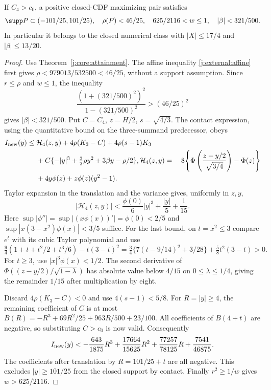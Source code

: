 \begin{proposition}\label{j:finite:n4-localization}
If $C_4>c_0$, a positive closed-CDF maximizing pair satisfies
\[
 \supp P\subset(-101/25,101/25),\quad\rho(P)<46/25,
 \quad 625/2116<w\le1,\quad|\beta|<321/500.
\]
In particular it belongs to the closed numerical class with
$|X|\le17/4$ and $|\beta|\le13/20$.
\end{proposition}
\begin{proof}
Use Theorem~\ref{j:core:attainment}.  The affine inequality
\eqref{j:external:affine} first gives
$\rho<979013/532500<46/25$, without a support assumption.
Since $r\le\rho$ and $w\le1$, the inequality
\[
 \frac{(1+(321/500)^2)^2}{1-(321/500)^2}>(46/25)^2
\]
gives $|\beta|<321/500$.
Put $C=C_4$, $z=H/2$, $s=\sqrt{4/3}$.  The contact expression,
using the quantitative bound on the three-summand predecessor, obeys
\begin{align*}
 I_{\rm new}(y)\le{}&\mathcal H_4(z,y)+4\rho(K_3-C)
                    +4\rho(s-1)K_3\\
 &+C\{-|y|^3+\tfrac32\rho y^2+3\beta y-\rho/2\},
\mathcal H_4(z,y)={}&8\!\left\{\Phi\left(\frac{z-y/2}{\sqrt{3/4}}\right)-\Phi(z)\right\}
                 \\
 &+4y\phi(z)+z\phi(z)(y^2-1).
\end{align*}
Taylor expansion in the translation and the variance gives, uniformly
in $z,y$,
\[
 |\mathcal H_4(z,y)|<\frac{\phi(0)}6|y|^3+\frac{|y|}{5}+\frac1{15}.
\]
Here $\sup|\phi''|=\sup|(x\phi(x))'|=\phi(0)<2/5$ and
$\sup|x(3-x^2)\phi(x)|<3/5$ suffice.  For the last bound, on
$t=x^2\le3$ compare $e^t$ with its cubic Taylor polynomial and use
\[
 \tfrac94(1+t+t^2/2+t^3/6)-t(3-t)^2
 =\tfrac34\{7(t-9/14)^2+3/28\}+\tfrac58t^2(3-t)>0.
\]
For $t\ge3$, use $|x|^3\phi(x)<1/2$.
The second derivative of
$\Phi((z-y/2)/\sqrt{1-\lambda})$ has absolute value below $4/15$
on $0\le\lambda\le1/4$, giving the remainder $1/15$ after
multiplication by eight.

Discard $4\rho(K_3-C)<0$ and use $4(s-1)<5/8$.
For $R=|y|\ge4$, the remaining coefficient of $C$ is at most
$B(R)=-R^3+69R^2/25+963R/500+23/100$.
All coefficients of $B(4+t)$ are negative, so substituting $C>c_0$
is now valid.  Consequently
\[
 I_{\rm new}(y)<-\frac{643}{1875}R^3+
 \frac{17664}{15625}R^2+\frac{77257}{78125}R+\frac{7541}{46875}.
\]
The coefficients after translation by $R=101/25+t$ are all negative.
This excludes $|y|\ge101/25$ from the closed support by contact.
Finally $r^2\ge1/w$ gives $w>625/2116$.
\end{proof}




